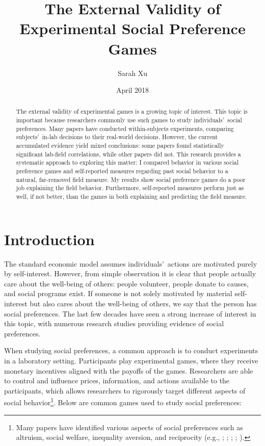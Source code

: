 \documentclass[12pt]{article}
\title{The External Validity of Experimental Social Preference Games}
\author{Sarah Xu}
\date{April 2018}
\begin{document}
\maketitle


\begin{abstract}
\begin{singlespace}
The external validity of experimental games is a growing topic of interest. This topic is important because researchers commonly use such games to study individuals\rq \ social preferences. Many papers have conducted within-subjects experiments, comparing subjects\rq \ in-lab decisions to their real-world decisions. However, the current accumulated evidence yield mixed conclusions: some papers found statistically significant lab-field correlations, while other papers did not. This research provides a systematic approach to exploring this matter: I compared behavior in various social preference games and self-reported measures regarding past social behavior to a natural, far-removed field measure. My results show social preference games do a poor job explaining the field behavior. Furthermore, self-reported measures perform just as well, if not better, than the games in both explaining and predicting the field measure.
\end{singlespace}
\end{abstract}


\tableofcontents

\section{Introduction}

The standard economic model assumes individuals\rq \ actions are motivated purely by self-interest. However, from simple observation it is clear that people actually care about the well-being of others: people volunteer, people donate to causes, and social programs exist. If someone is not solely motivated by material self-interest but also cares about the well-being of others, we say that the person has social preferences. The last few decades have seen a strong increase of interest in this topic, with numerous research studies providing evidence of social preferences. %
 
When studying social preferences, a common approach is to conduct experiments in a laboratory setting. Participants play experimental games, where they receive monetary incentives aligned with the payoffs of the games. Researchers are able to control and influence prices, information, and actions available to the participants, which allows researchers to rigorously target different aspects of social behavior\footnote{Many papers have identified various aspects of social preferences such as altruism, social welfare, inequality aversion, and reciprocity (e.g., \cite{charness_rabin_2002}; \cite{fehr_schmidt_1999}; \cite{andreoni_miller_2002}; \cite{rabin_1993}; \cite{fisman_jakiela_kariv_2014}).}. Below are common games used to study social preferences: 
\end{document}
